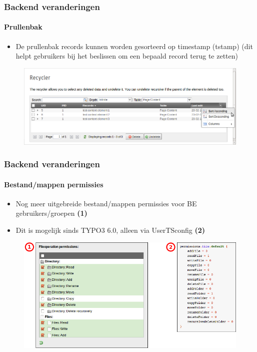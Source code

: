 
\begin{frame}[fragile]
	\frametitle{Backend veranderingen}
	\framesubtitle{Prullenbak}

 	\begin{itemize}
		\item De prullenbak records kunnen worden gesorteerd op timestamp (tstamp)\newline
			(dit helpt gebruikers bij het beslissen om een bepaald record terug te zetten)
	\end{itemize}

	\begin{figure}
		\includegraphics[width=0.95\linewidth]{Images/BackendChanges/RecyclerSortRecord.png}
	\end{figure}

\end{frame}


\begin{frame}[fragile]
	\frametitle{Backend veranderingen}
	\framesubtitle{Bestand/mappen permissies}

 	\begin{itemize}
		\item Nog meer uitgebreide bestand/mappen permissies voor BE gebruikers/groepen
			\begingroup\color{typo3red}\textbf{(1)}\endgroup
		\item Dit is mogelijk sinds TYPO3 6.0, alleen via UserTSconfig
			\begingroup\color{typo3red}\textbf{(2)}\endgroup
	\end{itemize}

	\begin{figure}
		\includegraphics[width=0.75\linewidth]{Images/BackendChanges/FileAndDirectoryPermissions.png}
	\end{figure}

\end{frame}

